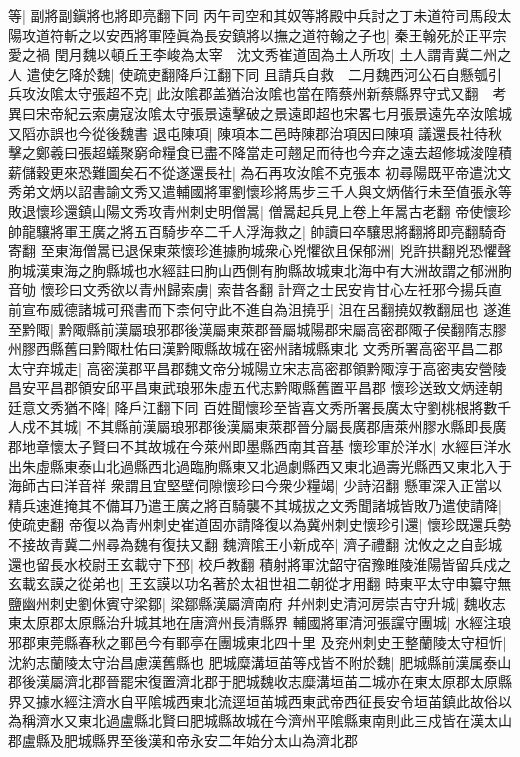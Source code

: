 等|{
	副將副鎭將也將即亮翻下同}
丙午司空和其奴等將殿中兵討之丁未道符司馬段太陽攻道符斬之以安西將軍陸眞為長安鎮將以撫之道符翰之子也|{
	秦王翰死於正平宗愛之禍}
閏月魏以頓丘王李峻為太宰　沈文秀崔道固為土人所攻|{
	土人謂青冀二州之人}
遣使乞降於魏|{
	使疏吏翻降戶江翻下同}
且請兵自救　二月魏西河公石自懸瓠引兵攻汝隂太守張超不克|{
	此汝隂郡盖猶治汝隂也當在隋蔡州新蔡縣界守式又翻　考異曰宋帝紀云索虜寇汝隂太守張景遠擊破之景遠即超也宋畧七月張景遠先卒汝隂城又䧟亦誤也今從後魏書}
退屯陳項|{
	陳項本二邑時陳郡治項因曰陳項}
議還長社待秋擊之鄭羲曰張超蟻聚窮命糧食已盡不降當走可翹足而待也今弃之遠去超修城浚隍積薪儲穀更來恐難圖矣石不從遂還長社|{
	為石再攻汝隂不克張本}
初尋陽既平帝遣沈文秀弟文炳以詔書諭文秀又遣輔國將軍劉懷珍將馬步三千人與文炳偕行未至值張永等敗退懷珍還鎮山陽文秀攻青州刺史明僧暠|{
	僧暠起兵見上卷上年暠古老翻}
帝使懷珍帥龍驤將軍王廣之將五百騎步卒二千人浮海救之|{
	帥讀曰卒驤思將翻將即亮翻騎奇寄翻}
至東海僧暠已退保東萊懷珍進據朐城衆心兇懼欲且保郁洲|{
	兇許拱翻兇恐懼聲朐城漢東海之胊縣城也水經註曰胊山西側有朐縣故城東北海中有大洲故謂之郁洲胊音劬}
懷珍曰文秀欲以青州歸索虜|{
	索昔各翻}
計齊之士民安肯甘心左祍邪今揚兵直前宣布威德諸城可飛書而下柰何守此不進自為沮撓乎|{
	沮在呂翻撓奴教翻屈也}
遂進至黔陬|{
	黔陬縣前漢屬琅邪郡後漢屬東萊郡晉屬城陽郡宋屬高密郡陬子侯翻隋志膠州膠西縣舊曰黔陬杜佑曰漢黔陬縣故城在密州諸城縣東北}
文秀所署高密平昌二郡太守弃城走|{
	高密漢郡平昌郡魏文帝分城陽立宋志高密郡領黔陬淳于高密夷安營陵昌安平昌郡領安邱平昌東武琅邪朱虛五代志黔陬縣舊置平昌郡}
懷珍送致文炳逹朝廷意文秀猶不降|{
	降戶江翻下同}
百姓聞懷珍至皆喜文秀所署長廣太守劉桃根將數千人戍不其城|{
	不其縣前漢屬琅邪郡後漢屬東萊郡晉分屬長廣郡唐萊州膠水縣即長廣郡地章懷太子賢曰不其故城在今萊州即墨縣西南其音基}
懷珍軍於洋水|{
	水經巨洋水出朱虛縣東泰山北過縣西北過臨朐縣東又北過劇縣西又東北過壽光縣西又東北入于海師古曰洋音祥}
衆謂且宜堅壁伺隙懷珍曰今衆少糧竭|{
	少詩沼翻}
懸軍深入正當以精兵速進掩其不備耳乃遣王廣之將百騎襲不其城拔之文秀聞諸城皆敗乃遣使請降|{
	使疏吏翻}
帝復以為青州刺史崔道固亦請降復以為冀州刺史懷珍引還|{
	懷珍既還兵勢不接故青冀二州尋為魏有復扶又翻}
魏濟隂王小新成卒|{
	濟子禮翻}
沈攸之之自彭城還也留長水校尉王玄載守下邳|{
	校戶教翻}
積射將軍沈韶守宿豫睢陵淮陽皆留兵戍之玄載玄謨之從弟也|{
	王玄謨以功名著於太祖世祖二朝從才用翻}
時東平太守申纂守無鹽幽州刺史劉休賓守梁鄒|{
	梁鄒縣漢屬濟南府}
幷州刺史清河房崇吉守升城|{
	魏收志東太原郡太原縣治升城其地在唐濟州長清縣界}
輔國將軍清河張讜守團城|{
	水經注琅邪郡東莞縣春秋之鄆邑今有鄆亭在團城東北四十里}
及兖州刺史王整蘭陵太守桓忻|{
	沈約志蘭陵太守治昌慮漢舊縣也}
肥城糜溝垣苖等戍皆不附於魏|{
	肥城縣前漢属泰山郡後漢屬濟北郡晉罷宋復置濟北郡于肥城魏收志糜溝垣苖二城亦在東太原郡太原縣界又據水經注濟水自平隂城西東北流逕垣苖城西東武帝西征長安令垣苖鎮此故俗以為稱濟水又東北過盧縣北賢曰肥城縣故城在今濟州平隂縣東南則此三戍皆在漢太山郡盧縣及肥城縣界至後漢和帝永安二年始分太山為濟北郡}
